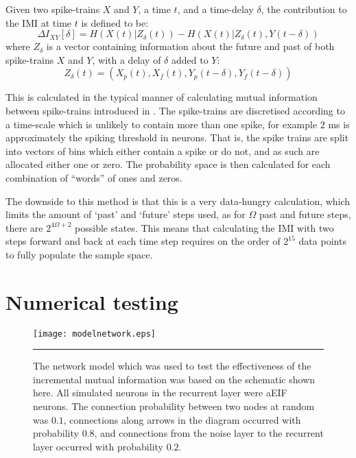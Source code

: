 Given two spike-trains $X$ and $Y$, a time $t$, and a time-delay $\delta$, the contribution to the IMI at time $t$ is defined to be:
\begin{equation}
\Delta I_{XY}[\delta] = H\left(X(t) | Z_{\delta}(t)\right) - H\left(X(t) | Z_{\delta}(t),Y(t-\delta)\right)
\end{equation}
where $Z_{\delta}$ is a vector containing information about the future and past of both spike-trains $X$ and $Y$, with a delay of $\delta$ added to $Y$:
\begin{equation}
Z_{\delta}(t) =  \left(X_p(t),X_f(t),Y_p(t-\delta), Y_f(t-\delta)\right)
\end{equation}

This is calculated in the typical manner of calculating mutual information between spike-trains introduced in \citep{BialekEtAl1998a}.  The spike-trains are discretised according to a time-scale which is unlikely to contain more than one spike, for example $2$ ms is approximately the spiking threshold in neurons. That is, the spike trains are split into vectors of bins which either contain a spike or do not, and as such are allocated either one or zero.  The probability space is then calculated for each combination of ``words'' of ones and zeros.

The downside to this method is that this is a very data-hungry calculation, which limits the amount of `past' and `future' steps used, as for $\Omega$ past and future steps, there are $2^{4\Omega+2}$ possible states. This means that calculating the IMI with two steps forward and back at each time step requires on the order of $2^{15}$ data points to fully populate the sample space.

\section{Numerical testing}

\begin{figure}[h!tb]
  \centering
  \texttt{[image: modelnetwork.eps]}
  \bigskip
  \rule{33em}{0.5pt}
  \caption{\label{modelnetwork}The network model which was used to test the effectiveness of the incremental mutual information was based on the schematic shown here.  All simulated neurons in the recurrent layer were aEIF neurons.  The connection probability between two nodes at random was $0.1$, connections along arrows in the diagram occurred with probability $0.8$, and connections from the noise layer to the recurrent layer occurred with probability $0.2$.}
\end{figure}

